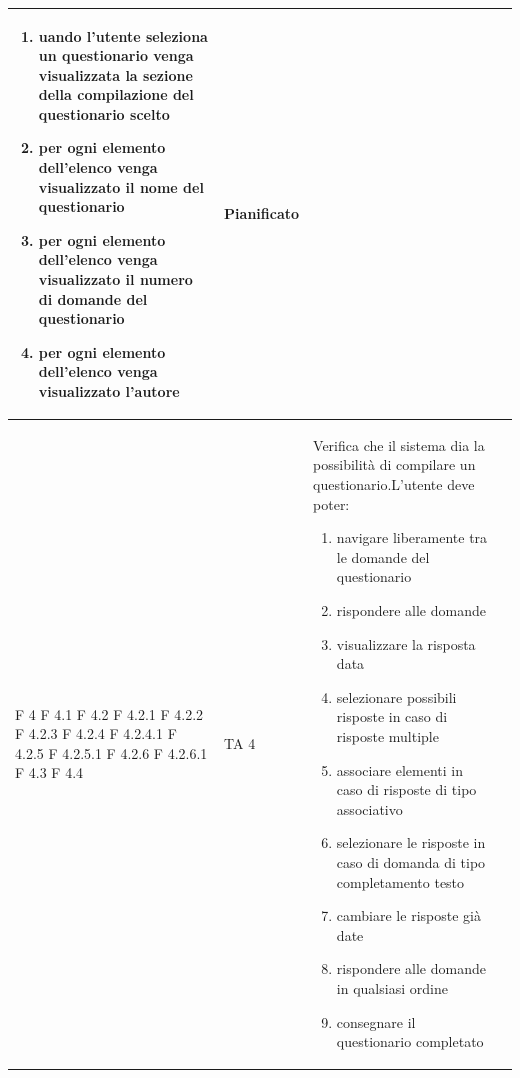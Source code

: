 \documentclass[a4paper,11pt]{article}
\begin{document}
\begin{longtable}{p{}p{}p{}p{}}
\begin{enumerate}
\item uando l'utente seleziona un questionario venga visualizzata la sezione della compilazione del questionario scelto
\item per ogni elemento dell'elenco venga visualizzato il nome del questionario
\item per ogni elemento dell'elenco venga visualizzato il numero di domande del questionario
\item per ogni elemento dell'elenco venga visualizzato l'autore
\end{enumerate} & Pianificato\\
\midrule
F 4 \newline F 4.1 \newline F 4.2 \newline F 4.2.1 \newline F 4.2.2 \newline F 4.2.3 \newline F 4.2.4 \newline F 4.2.4.1 \newline F 4.2.5 \newline F 4.2.5.1 \newline F 4.2.6 \newline F 4.2.6.1 \newline F 4.3 \newline F 4.4& TA 4& Verifica che il sistema dia la possibilità di compilare un questionario.\newline L'utente deve poter:
\begin{enumerate}
\item navigare liberamente tra le domande del questionario
\item rispondere alle domande
\item visualizzare la risposta data
\item selezionare possibili risposte in caso di risposte multiple
\item associare elementi in caso di risposte di tipo associativo
\item selezionare le risposte in caso di domanda di tipo completamento testo
\item cambiare le risposte già date
\item rispondere alle domande in qualsiasi ordine
\item consegnare il questionario completato


\end{enumerate}
\end{longtable}
\end{document}
